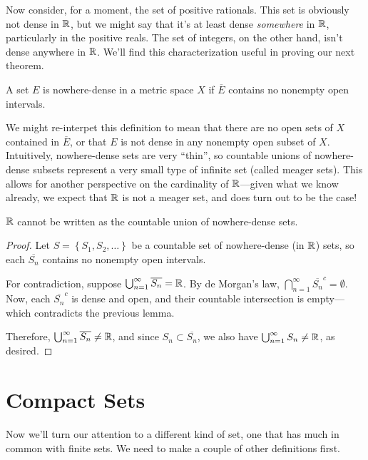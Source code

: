 \documentclass[../m131main.tex]{subfiles}
\begin{document}
Now consider, for a moment, the set of positive rationals.
This set is obviously not dense in $\mathbb{R}$, but we might say that it's at least dense \textit{somewhere} in $\mathbb{R}$, particularly in the positive reals.
The set of integers, on the other hand, isn't dense anywhere in $\mathbb{R}$.
We'll find this characterization useful in proving our next theorem.

\begin{definition}
    A set $E$ is nowhere-dense in a metric space $X$ if $\overline{E}$ contains no nonempty open intervals.
\end{definition}

We might re-interpet this definition to mean that there are no open sets of $X$ contained in $\overline{E}$, or that $E$ is not dense in any nonempty open subset of $X$.
Intuitively, nowhere-dense sets are very ``thin'', so countable unions of nowhere-dense subsets represent a very small type of infinite set (called meager sets).
This allows for another perspective on the cardinality of $\mathbb{R}$---given what we know already, we expect that $\mathbb{R}$ is not a meager set, and does turn out to be the case!

\begin{theorem}
    $\mathbb{R}$ cannot be written as the countable union of nowhere-dense sets.
\end{theorem}

\begin{proof}
    Let $S = \left\{ S_1, S_2, \ldots \right\}$ be a countable set of nowhere-dense (in $\mathbb{R}$) sets, so each $\overline{S_n}$ contains no nonempty open intervals.

    For contradiction, suppose $\bigcup_{n=1}^\infty \overline{S_n} = \mathbb{R}$.
    By de Morgan's law, $\bigcap_{n=1}^\infty \overline{S_n}^c = \emptyset$.
    Now, each $\overline{S_n}^c$ is dense and open, and their countable intersection is empty---which contradicts the previous lemma.

    Therefore, $\bigcup_{n=1}^\infty \overline{S_n} \neq \mathbb{R}$, and since $S_n \subset \overline{S_n}$, we also have $\bigcup_{n=1}^\infty S_n \neq \mathbb{R}$, as desired.
\end{proof}

\section{Compact Sets}
Now we'll turn our attention to a different kind of set, one that has much in common with finite sets.
We need to make a couple of other definitions first.
\end{document}

